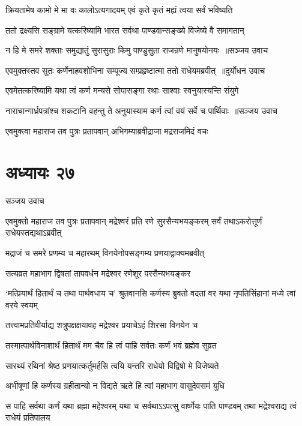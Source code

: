 \twolineshloka
{क्रियतामेष कामो मे मा वः कालोऽत्यगादयम्}
{एवं कृते कृतं मह्यं त्वया सर्वं भविष्यति}


\twolineshloka
{ततो द्रक्ष्यसि सङ्ग्रामे यत्करिष्यामि भारत}
{सर्वथा पाण्डवान्सङ्ख्ये विजेष्ये वै समागतान्}


\threelineshloka
{न हि मे समरे शक्ताः समुद्यातुं सुरासुराः}
{किमु पाण्डुसुता राजन्रणे मानुषयोनयः ॥सञ्जय उवाच}
{}


\threelineshloka
{एवमुक्तस्तव सुतः कर्णेनाहवशोभिना}
{सम्पूज्य सम्प्रहृष्टात्मा ततो राधेयमब्रवीत् ॥दुर्योधन उवाच}
{}


\twolineshloka
{एवमेतत्करिष्यामि यथा त्वं कर्ण मन्यसे}
{सोपासङ्गा रथाः साश्वाः स्वनुयास्यन्ति संयुगे}


\threelineshloka
{नाराचान्गार्ध्रपत्रांश्च शकटानि वहन्तु ते}
{अनुयास्याम कर्ण त्वां वयं सर्वे च पार्थिवाः ॥सञ्जय उवाच}
{}


\twolineshloka
{एवमुक्त्वा महाराज तव पुत्रः प्रतापवान्}
{अभिगम्याब्रवीद्राजा मद्रराजमिदं वचः}


\chapter{अध्यायः २७}
\twolineshloka
{सञ्जय उवाच}
{}


\threelineshloka
{एवमुक्तो महाराज तव पुत्रः प्रतापवान्}
{मद्रेश्वरं प्रति रणे सुरसैन्यभयङ्करम्}
{सर्वं तथाऽकरोत्तूर्णं राधेयस्तद्यथाऽब्रवीत्}


\twolineshloka
{मद्राजं च समरे प्रणम्य च महारथम्}
{विनयेनोपसङ्गम्य प्रणयाद्वाक्यमब्रवीत्}


\twolineshloka
{सत्यव्रत महाभाग द्विषतां तापवर्धन}
{मद्रेश्वर रणेशूर परसैन्यभयङ्कर}


\threelineshloka
{`मत्प्रियार्थं हितार्थं च तथा पार्थवधाय च'}
{श्रुतवानसि कर्णस्य ब्रुवतो वदतां वर}
{यथा नृपतिसिंहानां मध्ये त्वां वरये स्वयम्}


\twolineshloka
{तत्त्वामप्रतिवीर्याद्य शत्रुपक्षक्षयावह}
{मद्रेश्वर प्रयाचेऽहं शिरसा विनयेन च}


\twolineshloka
{तस्मात्पार्थविनाशार्थं हितार्थं मम चैव हि}
{त्वं पाहि सर्वतः कर्णं भवं ब्रह्मेव सुव्रत}


\twolineshloka
{सारथ्यं रथिनां श्रेष्ठ प्रणयात्कर्तुमर्हसि}
{त्वयि यन्तरि राधेयो विद्विषो मे विजेष्यते}


\twolineshloka
{अभीषूणां हि कर्णस्य ग्रहीतान्यो न विद्यते}
{ऋते हि त्वां महाभाग वासुदेवसमं युधि}


\threelineshloka
{स पाहि सर्वथा कर्णं यथा ब्रह्मा महेश्वरम्}
{यथा च सर्वथाऽऽपत्सु वार्ष्णेयः पाति पाण्डवम्}
{तथा मद्रेश्वराद्य त्वं राधेयं प्रतिपालय}


